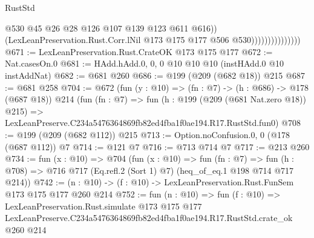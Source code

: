 \begin{lexlean}{RustStd}
\begin{coremodule}
                                    @530
                                    @45
                                    @26
                                    @28
                                    @126
                                    @107
                                    @139
                                    @123
                                    @611
                                    @616))
                                (LexLeanPreservation.Rust.Corr.lNil
                                  @173
                                  @175
                                  @177
                                  @506
                                  @530)))))))))))))))
@671 := LexLeanPreservation.Rust.CrateOK @173 @175 @177
@672 := Nat.casesOn.{0}
@681 := HAdd.hAdd.{0, 0, 0} @10 @10 @10 (instHAdd.{0} @10 instAddNat)
@682 := @681 @260
@686 := @199 (@209 (@682 @18)) @215
@687 := @681 @258
@704 := @672
    (fun (y : @10) => (fn : @7) -> (h : @686) -> @178 (@687 @18))
    @214
    (fun (fn : @7) =>
    fun (h : @199 (@209 (@681 Nat.zero @18)) @215) =>
    LexLeanPreserve.C234a5476364869fb82ed4fba1f0ae194.R17.RustStd.fun0)
@708 := @199 (@209 (@682 @112)) @215
@713 := Option.noConfusion.{0, 0} (@178 (@687 @112)) @7
@714 := @121 @7
@716 := @713 @714 @7
@717 := @213 @260
@734 := fun (x : @10) =>
  @704
    (fun (x : @10) =>
    fun (fn : @7) =>
    fun (h : @708) => @716 @717 (Eq.refl.{2} (Sort 1) @7) (heq_of_eq.{1} @198 @714 @717 @214))
@742 := (n : @10) -> (f : @10) -> LexLeanPreservation.Rust.FunSem @173 @175 @177 @260 @214
@752 := fun (n : @10) =>
  fun (f : @10) =>
  LexLeanPreservation.Rust.simulate
    @173
    @175
    @177
    LexLeanPreserve.C234a5476364869fb82ed4fba1f0ae194.R17.RustStd.crate_ok
    @260
    @214
\end{coremodule}
\end{lexlean}
